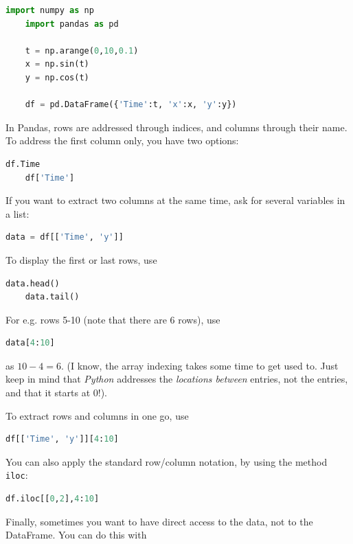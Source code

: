 \begin{lstlisting}[language=Python]
    import numpy as np
    import pandas as pd

    t = np.arange(0,10,0.1)
    x = np.sin(t)
    y = np.cos(t)

    df = pd.DataFrame({'Time':t, 'x':x, 'y':y})
\end{lstlisting}

In Pandas, rows are addressed through indices, and columns through their name.
To address the first column only, you have two options:

\begin{lstlisting}[language=Python]
    df.Time
    df['Time']
\end{lstlisting}

If you want to extract two columns at the same time, ask for several variables in a list:

\begin{lstlisting}[language=Python]
    data = df[['Time', 'y']]
\end{lstlisting}

To display the first or last rows, use

\begin{lstlisting}[language=Python]
    data.head()
    data.tail()
\end{lstlisting}

For e.g. rows 5-10 (note that there are 6 rows), use

\begin{lstlisting}[language=Python]
    data[4:10]
\end{lstlisting}

as $10-4=6$. (I know, the array indexing takes some time to get used to. Just keep in mind that \emph{Python} addresses the \emph{locations between} entries, not the entries, and that it starts at $0$!).

To extract rows and columns in one go, use

\begin{lstlisting}[language=Python]
    df[['Time', 'y']][4:10]
\end{lstlisting}

You can also apply the standard row/column notation, by using the method \lstinline{iloc}:

\begin{lstlisting}[language=Python]
    df.iloc[[0,2],4:10]
\end{lstlisting}

Finally, sometimes you want to have direct access to the data, not to the DataFrame. You can do this with

